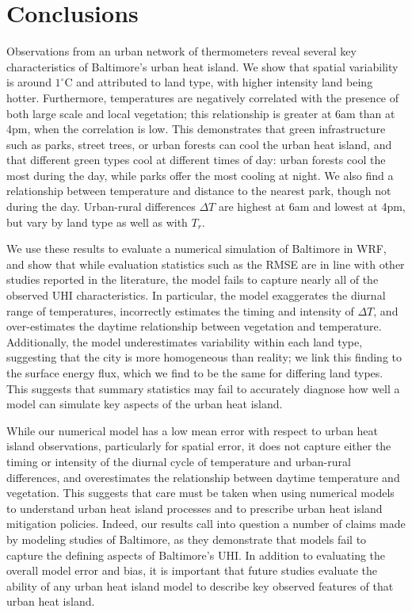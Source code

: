 \documentclass[draft,linenumbers]{agujournal}
\begin{document}
\section{Conclusions}\label{sec:conclusions}
Observations from an urban network of thermometers reveal several key characteristics of Baltimore's urban heat island. We show that spatial variability is around $1^\circ$C and attributed to land type, with higher intensity land being hotter. Furthermore, temperatures are negatively correlated with the presence of both large scale and local vegetation; this relationship is greater at 6am than at 4pm, when the correlation is low.  This demonstrates that green infrastructure such as parks, street trees, or urban forests can cool the urban heat island, and that different green types cool at different times of day: urban forests cool the most during the day, while parks offer the most cooling at night. 
We also find a relationship between temperature and distance to the nearest park, though not during the day. Urban-rural differences $\Delta T$ are highest at 6am and lowest at 4pm, but vary by land type as well as with $T_r$.

 We use these results to evaluate a numerical simulation of Baltimore in WRF, and show that while evaluation statistics such as the RMSE are in line with other studies reported in the literature, the model fails to capture nearly all of the observed UHI characteristics. In particular, the model exaggerates the diurnal range of temperatures, incorrectly estimates the timing and intensity of $\Delta T$, and over-estimates the daytime relationship between vegetation and temperature. Additionally, the model underestimates variability within each land type, suggesting that the city is more homogeneous than reality; we link this finding to the surface energy flux, which we find to be the same for differing land types. This suggests that summary statistics may fail to accurately diagnose how well a model can simulate key aspects of the urban heat island. 


While our numerical model has a low mean error with respect to urban heat island observations, particularly for spatial error, it does not capture either the timing or intensity of the diurnal cycle of temperature and urban-rural differences, and overestimates the relationship between daytime temperature and vegetation. This suggests that care must be taken when using numerical models to understand urban heat island processes and to prescribe urban heat island mitigation policies. Indeed, our results call into question a number of claims made by modeling studies of Baltimore, as they demonstrate that models fail to capture the defining aspects of Baltimore's UHI. In addition to evaluating the overall model error and bias, it is important that future studies evaluate the ability of any urban heat island model to describe key observed features of that urban heat island. 
\end{document}
